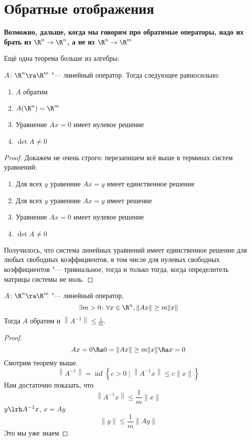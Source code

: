 \section{Обратные отображения}

\textbf{\color{red} Возможно, дальше, когда мы говорим про обратимые операторы, надо их брать из $\R^n \to \R^n$, а не из $\R^n \to \R^m$}

Ещё одна теорема больше из алгебры:
\begin{theorem}
	$A\colon \R^n \ra \R^m$ "--- линейный оператор. Тогда следующее равносильно:
	\begin{enumerate}
		\item $A$ обратим
		\item $A(\R^n) = \R^m$
		\item Уравнение $Ax = 0$ имеет нулевое решение
		\item $\det A \ne 0$
	\end{enumerate}
\end{theorem}
\begin{proof}
	Докажем не очень строго: перезапишем всё выше в терминах систем уравнений:
	\begin{enumerate}
		\item Для всех $y$ уравенние $Ax = y$ имеет единственное решение
		\item Для всех $y$ уравенние $Ax = y$ имеет решение
		\item Уравнение $Ax = 0$ имеет нулевое решение
		\item $\det A \ne 0$
	\end{enumerate}
	Получилось, что система линейных уравнений имеет единственное решение для любых свободных коэффициентов, в том числе для нулевых свободных коэффициентов "--- тривиальное, тогда и только тогда, когда определитель матрицы системы не ноль.
\end{proof}

\begin{theorem}
	$A\colon \R^n \ra \R^m$ "--- линейный оператор,
	\[ \exists m > 0\colon \forall x \in \R^n, \|Ax\| \ge m\|x\| \]
	Тогда $A$ обратим и $\left\|A^{-1}\right\| \le \frac1m$.
\end{theorem}
\begin{proof}
	\[ Ax = 0 \Ra 0 = \|Ax\| \ge m\|x\| \Ra x = 0 \]
	Смотрим теорему выше.
	\[ \left\|A^{-1}\right\| = \inf \left\{c > 0 \mid \left\|A^{-1} x\right\| \le c \|x\| \right\} \]
	Нам достаточно показать, что
	\[ \left\|A^{-1} x\right\| \le \frac{1}m \|x\| \]
	$y \lrh A^{-1} x$, $x = Ay$
	\[ \|y\| \le \frac{1}m \|Ay\| \]
	Это мы уже знаем
\end{proof}

